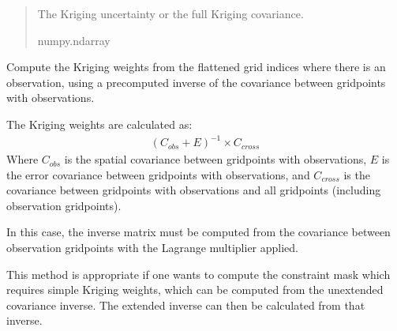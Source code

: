 \documentclass[letterpaper,10pt,english]{sphinxmanual}
\begin{document}
\begin{fulllineitems}
\begin{fulllineitems}
\begin{quote}
\begin{description}
\sphinxAtStartPar
{} \textendash{} The Kriging uncertainty or the full Kriging covariance.

\sphinxAtStartPar
numpy.ndarray

\end{description}\end{quote}

\end{fulllineitems}


\begin{fulllineitems}
\label{\detokenize{kriging:glomar_gridding.kriging.OrdinaryKriging.kriging_weights_from_inverse}}
\pysigstartsignatures
\pysiglinewithargsret
{}
{}
{}
\pysigstopsignatures
\sphinxAtStartPar
Compute the Kriging weights from the flattened grid indices where
there is an observation, using a pre\sphinxhyphen{}computed inverse of the covariance
between grid\sphinxhyphen{}points with observations.

\sphinxAtStartPar
The Kriging weights are calculated as:
\begin{equation*}
\begin{split}(C_{obs} + E)^{-1} \times C_{cross}\end{split}
\end{equation*}
\sphinxAtStartPar
Where \(C_{obs}\) is the spatial covariance between grid\sphinxhyphen{}points
with observations, \(E\) is the error covariance between grid\sphinxhyphen{}points
with observations, and \(C_{cross}\) is the covariance between
grid\sphinxhyphen{}points with observations and all grid\sphinxhyphen{}points (including observation
grid\sphinxhyphen{}points).

\sphinxAtStartPar
In this case, the inverse matrix must be computed from the covariance
between observation grid\sphinxhyphen{}points with the Lagrange multiplier applied.

\sphinxAtStartPar
This method is appropriate if one wants to compute the constraint mask
which requires simple Kriging weights, which can be computed from the
unextended covariance inverse. The extended inverse can then be
calculated from that inverse.


\end{fulllineitems}
\end{fulllineitems}
\end{document}
